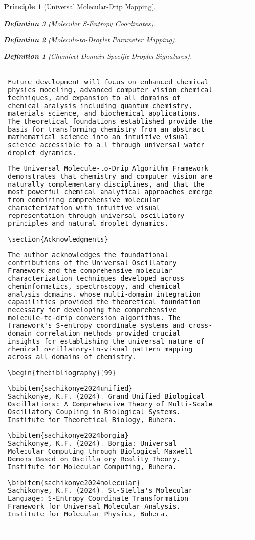 \documentclass[12pt,a4paper]{article}
\newtheorem{definition}{Definition}
\newtheorem{principle}{Principle}
\begin{document}
\begin{principle}[Universal Molecular-Drip Mapping]
\begin{definition}[Molecular S-Entropy Coordinates]
\begin{definition}[Molecule-to-Droplet Parameter Mapping]
\begin{algorithm}
\begin{algorithmic}[1]
\begin{definition}[Chemical Domain-Specific Droplet Signatures]
\begin{table}[H]
\begin{tabular}{lcccc}
\begin{lstlisting}[style=pythonstyle, caption=Computer Vision Comprehensive Chemical Pattern Analysis]
Future development will focus on enhanced chemical physics modeling, advanced computer vision chemical techniques, and expansion to all domains of chemical analysis including quantum chemistry, materials science, and biochemical applications. The theoretical foundations established provide the basis for transforming chemistry from an abstract mathematical science into an intuitive visual science accessible to all through universal water droplet dynamics.

The Universal Molecule-to-Drip Algorithm Framework demonstrates that chemistry and computer vision are naturally complementary disciplines, and that the most powerful chemical analytical approaches emerge from combining comprehensive molecular characterization with intuitive visual representation through universal oscillatory principles and natural droplet dynamics.

\section{Acknowledgments}

The author acknowledges the foundational contributions of the Universal Oscillatory Framework and the comprehensive molecular characterization techniques developed across cheminformatics, spectroscopy, and chemical analysis domains, whose multi-domain integration capabilities provided the theoretical foundation necessary for developing the comprehensive molecule-to-drip conversion algorithms. The framework's S-entropy coordinate systems and cross-domain correlation methods provided crucial insights for establishing the universal nature of chemical oscillatory-to-visual pattern mapping across all domains of chemistry.

\begin{thebibliography}{99}

\bibitem{sachikonye2024unified}
Sachikonye, K.F. (2024). Grand Unified Biological Oscillations: A Comprehensive Theory of Multi-Scale Oscillatory Coupling in Biological Systems. Institute for Theoretical Biology, Buhera.

\bibitem{sachikonye2024borgia}
Sachikonye, K.F. (2024). Borgia: Universal Molecular Computing through Biological Maxwell Demons Based on Oscillatory Reality Theory. Institute for Molecular Computing, Buhera.

\bibitem{sachikonye2024molecular}
Sachikonye, K.F. (2024). St-Stella's Molecular Language: S-Entropy Coordinate Transformation Framework for Universal Molecular Analysis. Institute for Molecular Physics, Buhera.


\end{lstlisting}
\end{tabular}
\end{table}
\end{definition}
\end{algorithmic}
\end{algorithm}
\end{definition}
\end{definition}
\end{principle}
\end{document}
